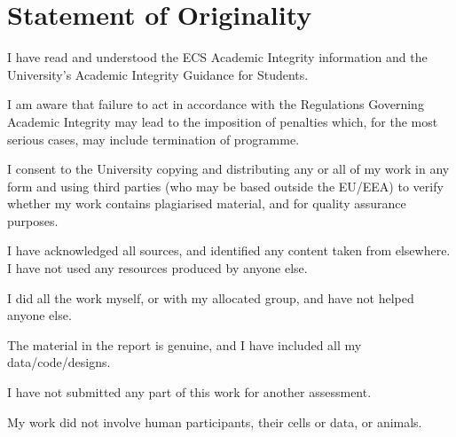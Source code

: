 \chapter*{Statement of Originality}{
    I have read and understood the ECS Academic Integrity information and the University’s Academic Integrity Guidance for Students.
    
    I am aware that failure to act in accordance with the Regulations Governing Academic Integrity may lead to the imposition of penalties which, for the most serious cases, may include termination of programme.
    
    I consent to the University copying and distributing any or all of my work in any form and using third parties (who may be based outside the EU/EEA) to verify whether my work contains plagiarised material, and for quality assurance purposes.
    
    I have acknowledged all sources, and identified any content taken from elsewhere.
    I have not used any resources produced by anyone else.
    
    I did all the work myself, or with my allocated group, and have not helped anyone else.
    
    The material in the report is genuine, and I have included all my data/code/designs.
    
    I have not submitted any part of this work for another assessment.
    
    My work did not involve human participants, their cells or data, or animals.
}